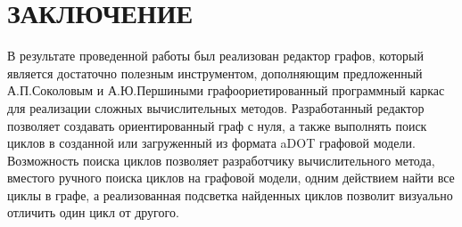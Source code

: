 \chapter*{ЗАКЛЮЧЕНИЕ}\label{chap_conclusion}

В результате проведенной работы был реализован редактор графов, который является достаточно полезным инструментом, дополняющим предложенный А.П.Соколовым и А.Ю.Першиными графоориетированный программный каркас для реализации сложных вычислительных методов. Разработанный редактор позволяет создавать ориентированный граф с нуля, а также выполнять поиск циклов в созданной или загруженный из формата aDOT графовой модели. Возможность поиска циклов позволяет разработчику вычислительного метода, вместого ручного поиска циклов на графовой модели, одним действием найти все циклы в графе, а реализованная подсветка найденных циклов позволит визуально отличить один цикл от другого.

